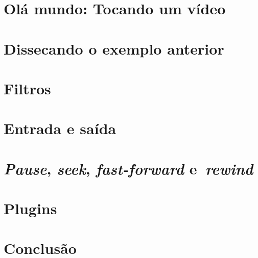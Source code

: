 \documentclass{SBCbookchapter}
\def\en#1{\foreignlanguage{english}{\emph{#1}}}
\begin{document}

\section{Olá mundo: Tocando um vídeo}
\label{sec:ola}



\section{Dissecando o exemplo anterior}
\label{sec:dissec}


\section{Filtros}
\label{sec:filtros}


\section{Entrada e saída}
\label{sec:e/s}


\section{\en{Pause}, \en{seek}, \en{fast-forward}
  e~\en{rewind}}
\label{sec:ops}


\section{Plugins}
\label{sec:plugins}


\section{Conclusão}
\label{sec:conclusao}




\end{document}
